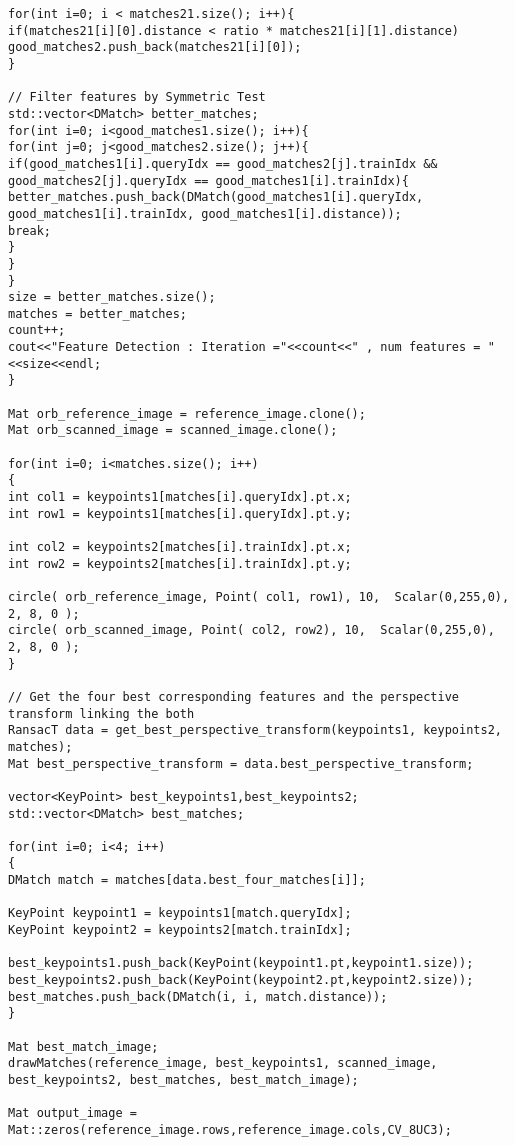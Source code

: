 \begin{lstlisting}
for(int i=0; i < matches21.size(); i++){
if(matches21[i][0].distance < ratio * matches21[i][1].distance)
good_matches2.push_back(matches21[i][0]);
}

// Filter features by Symmetric Test
std::vector<DMatch> better_matches;
for(int i=0; i<good_matches1.size(); i++){
for(int j=0; j<good_matches2.size(); j++){
if(good_matches1[i].queryIdx == good_matches2[j].trainIdx && good_matches2[j].queryIdx == good_matches1[i].trainIdx){
better_matches.push_back(DMatch(good_matches1[i].queryIdx, good_matches1[i].trainIdx, good_matches1[i].distance));
break;
}
}
}
size = better_matches.size();
matches = better_matches;
count++;
cout<<"Feature Detection : Iteration ="<<count<<" , num features = "<<size<<endl;
}

Mat orb_reference_image = reference_image.clone();
Mat orb_scanned_image = scanned_image.clone();

for(int i=0; i<matches.size(); i++)
{
int col1 = keypoints1[matches[i].queryIdx].pt.x;
int row1 = keypoints1[matches[i].queryIdx].pt.y;

int col2 = keypoints2[matches[i].trainIdx].pt.x;
int row2 = keypoints2[matches[i].trainIdx].pt.y;

circle( orb_reference_image, Point( col1, row1), 10,  Scalar(0,255,0), 2, 8, 0 );
circle( orb_scanned_image, Point( col2, row2), 10,  Scalar(0,255,0), 2, 8, 0 );
}

// Get the four best corresponding features and the perspective transform linking the both
RansacT data = get_best_perspective_transform(keypoints1, keypoints2, matches);
Mat best_perspective_transform = data.best_perspective_transform;

vector<KeyPoint> best_keypoints1,best_keypoints2;
std::vector<DMatch> best_matches;

for(int i=0; i<4; i++)
{
DMatch match = matches[data.best_four_matches[i]];

KeyPoint keypoint1 = keypoints1[match.queryIdx];
KeyPoint keypoint2 = keypoints2[match.trainIdx];

best_keypoints1.push_back(KeyPoint(keypoint1.pt,keypoint1.size));
best_keypoints2.push_back(KeyPoint(keypoint2.pt,keypoint2.size));
best_matches.push_back(DMatch(i, i, match.distance));
}

Mat best_match_image;
drawMatches(reference_image, best_keypoints1, scanned_image, best_keypoints2, best_matches, best_match_image);

Mat output_image = Mat::zeros(reference_image.rows,reference_image.cols,CV_8UC3);


\end{lstlisting}
